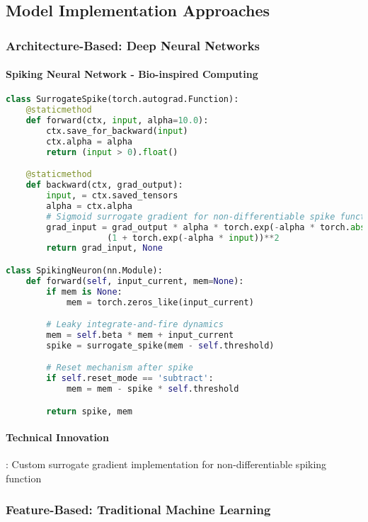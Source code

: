 \documentclass[11pt,a4paper]{article}
\begin{document}
\subsection{Model Implementation Approaches}

\subsubsection{Architecture-Based: Deep Neural Networks}

\paragraph{Spiking Neural Network - Bio-inspired Computing}
\begin{lstlisting}[language=Python, caption=SNN Technical Implementation]
class SurrogateSpike(torch.autograd.Function):
    @staticmethod
    def forward(ctx, input, alpha=10.0):
        ctx.save_for_backward(input)
        ctx.alpha = alpha
        return (input > 0).float()

    @staticmethod
    def backward(ctx, grad_output):
        input, = ctx.saved_tensors
        alpha = ctx.alpha
        # Sigmoid surrogate gradient for non-differentiable spike function
        grad_input = grad_output * alpha * torch.exp(-alpha * torch.abs(input)) / \
                    (1 + torch.exp(-alpha * input))**2
        return grad_input, None

class SpikingNeuron(nn.Module):
    def forward(self, input_current, mem=None):
        if mem is None:
            mem = torch.zeros_like(input_current)

        # Leaky integrate-and-fire dynamics
        mem = self.beta * mem + input_current
        spike = surrogate_spike(mem - self.threshold)

        # Reset mechanism after spike
        if self.reset_mode == 'subtract':
            mem = mem - spike * self.threshold

        return spike, mem
\end{lstlisting}

\paragraph{Technical Innovation}: Custom surrogate gradient implementation for non-differentiable spiking function

\subsubsection{Feature-Based: Traditional Machine Learning}
\end{document}

